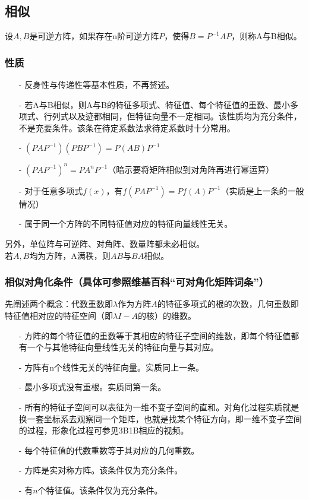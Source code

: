 \documentclass[UTF8]{ctexart}
\begin{document}
	\subsection{相似}
	设$A,B$是可逆方阵，如果存在n阶可逆方阵$P$，使得$B=P^{-1}AP$，则称A与B相似。
	\subsubsection{性质}
	\begin{itemize}
		\item [-]反身性与传递性等基本性质，不再赘述。
		\item [-]若A与B相似，则A与B的特征多项式、特征值、每个特征值的重数、最小多项式、行列式以及迹都相同，但特征向量不一定相同。该性质均为充分条件，不是充要条件。该条在待定系数法求待定系数时十分常用。
		\item [-]$(PAP^{-1})(PBP^{-1})=P(AB)P^{-1}$
		\item [-]$(PAP^{-1})^{n}=PA^{n}P^{-1}$（暗示要将矩阵相似到对角阵再进行幂运算）
		\item [-]对于任意多项式$f(x)$，有$f(PAP^{-1})=Pf(A)P^{-1}$（实质是上一条的一般情况）
		\item [-]属于同一个方阵的不同特征值对应的特征向量线性无关。
	\end{itemize}
	另外，单位阵与可逆阵、对角阵、数量阵都未必相似。\\
	\indent
	若$A,B$均为方阵，A满秩，则$AB$与$BA$相似。
	\subsubsection{相似对角化条件（具体可参照维基百科“可对角化矩阵词条”）}
	先阐述两个概念：代数重数即$\lambda$作为方阵$A$的特征多项式的根的次数，几何重数即特征值相对应的特征空间（即$\lambda I -A$的核）的维数。
	\begin{itemize}
		\item [-]方阵的每个特征值的重数等于其相应的特征子空间的维数，即每个特征值都有一个与其他特征向量线性无关的特征向量与其对应。
		\item [-]方阵有n个线性无关的特征向量。实质同上一条。
		\item [-]最小多项式没有重根。实质同第一条。
		\item [-]所有的特征子空间可以表征为一维不变子空间的直和。对角化过程实质就是换一套坐标系去观察同一个矩阵，也就是找某个特征方向，即一维不变子空间的过程，形象化过程可参见3B1B相应的视频。
		\item [-]每个特征值的代数重数等于其对应的几何重数。
		\item [-]方阵是实对称方阵。该条件仅为充分条件。
		\item [-]有$n$个特征值。该条件仅为充分条件。
	\end{itemize}
\end{document}
